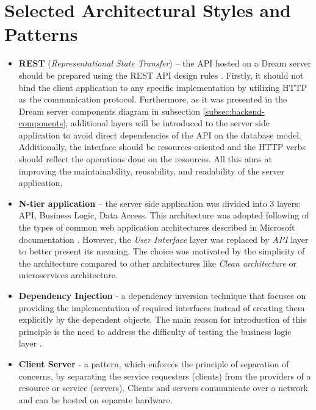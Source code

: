 
\section{Selected Architectural Styles and Patterns}\label{sec:patterns}
\begin{itemize}
    \item \textbf{REST} (\textit{Representational State Transfer}) – the API hosted on a Dream server should be prepared using the REST API design rules \cite{rest} \cite{rest-microsoft}. Firstly, it should not bind the client application to any specific implementation by utilizing HTTP as the communication protocol. Furthermore, as it was presented in the Dream server components diagram in subsection \ref{subsec:backend-components}, additional layers will be introduced to the server side application to avoid direct dependencies of the API on the database model. Additionally, the interface should be resources-oriented and the HTTP verbs should reflect the operations done on the resources. All this aims at improving the maintainability, reusability, and readability of the server application.
    \item \textbf{N-tier application} – the server side application was divided into 3 layers: API, Business Logic, Data Access. This architecture was adopted following of the types of common web application architectures described in Microsoft documentation \cite{ntier}. However, the \textit{User Interface} layer was replaced by \textit{API} layer to better present its meaning. The choice was motivated by the simplicity of the architecture compared to other architectures like \textit{Clean architecture} or microservices architecture. 
    \item \textbf{Dependency Injection} - a dependency inversion technique that focuses on providing the implementation of required interfaces instead of creating them explicitly by the dependent objects. The main reason for introduction of this principle is the need to address the difficulty of testing the business logic layer \cites{ntier} \cite{di}. 
    \item \textbf{Client Server} - a pattern, which enforces the principle of separation of concerns, by separating the service requesters (clients) from the providers of a resource or service (servers). Clients and servers communicate over a network and can be hosted on separate hardware. 
\end{itemize}

